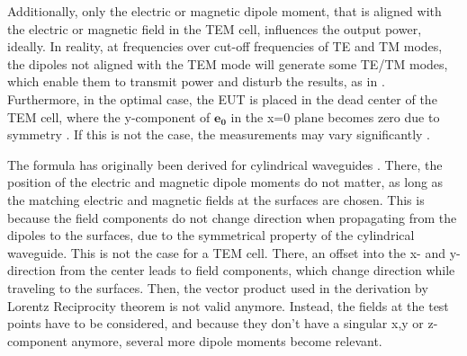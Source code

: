 Additionally, only the electric or magnetic dipole moment, that is aligned with the electric or magnetic field in the TEM cell, influences the output power, ideally. In reality, at frequencies over cut-off frequencies of TE and TM modes, the dipoles not aligned with the TEM mode will generate some TE/TM modes, which enable them to transmit power and disturb the results, as in \cite{Kreindl_Bauernfeind_Weiss_Stockreiter_Yenumula_Narayanan_Kaltenbacher_2022}. Furthermore, in the optimal case, the EUT is placed in the dead center of the TEM cell, where the y-component of $\mathbf{e_0}$ in the x=0 plane becomes zero due to symmetry \cite{Sreenivasiah_Chang_Ma_1981}. If this is not the case, the measurements may vary significantly \cite{Kreindl_Bauernfeind_Weiss_Stockreiter_Yenumula_Narayanan_Kaltenbacher_2022}.

The formula has originally been derived for cylindrical waveguides \cite{Collin_2015}. There, the position of the electric and magnetic dipole moments do not matter, as long as the matching electric and magnetic fields at the surfaces are chosen. This is because the field components do not change direction when propagating from the dipoles to the surfaces, due to the symmetrical property of the cylindrical waveguide. This is not the case for a TEM cell. There, an offset into the x- and y-direction from the center leads to field components, which change direction while traveling to the surfaces. Then, the vector product used in the derivation by Lorentz Reciprocity theorem is not valid anymore. Instead, the fields at the test points have to be considered, and because they don't have a singular x,y or z-component anymore, several more dipole moments become relevant.


